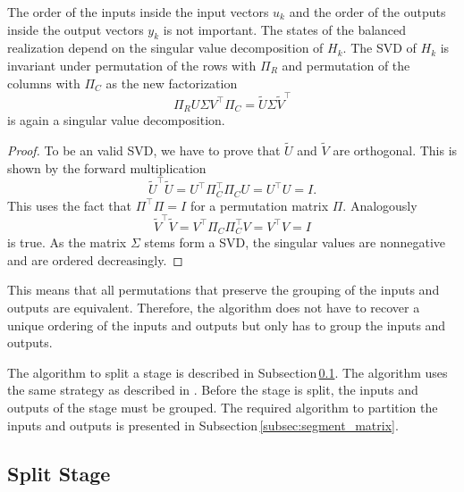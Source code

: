 \documentclass[numbers=noenddot,doctype=mastersthesis,BCOR=15mm,biblatex]{ldvbook}%
\newcommand{\eye}{I} %
\begin{document}
The order of the inputs inside the input vectors $u_k$ and the order of the outputs inside the output vectors $y_k$ is not important.
The states of the balanced realization depend on the singular value decomposition of $H_k$.
The SVD of $H_k$ is invariant under permutation of the rows with $\Pi_R$ and permutation of the columns with $\Pi_C$ as the new factorization
\begin{equation}
\Pi_R U \Sigma V^\top \Pi_C = \tilde{U} \Sigma \tilde{V}^\top 
\end{equation}
is again a singular value decomposition.
\begin{proof}
	To be an valid SVD, we have to prove that $\tilde{U}$ and $\tilde{V}$ are orthogonal.
	This is shown by the forward multiplication
	\begin{equation}
	\tilde{U}^\top \tilde{U} = U^\top \Pi_C^\top \Pi_C U = U^\top U = \eye 
	.
	\end{equation}
	This uses the fact that $\Pi^\top \Pi = \eye$ for a permutation matrix $\Pi$.
	Analogously 
	\begin{equation}
	\tilde{V}^\top \tilde{V} = V^\top \Pi_C \Pi_C^\top V = V^\top V = \eye
	\end{equation}
	is true.
	As the matrix $\Sigma$ stems form a SVD, the singular values are nonnegative and are ordered decreasingly.
\end{proof}
This means that all permutations that preserve the grouping of the inputs and outputs are equivalent.
Therefore, the algorithm does not have to recover a unique ordering of the inputs and outputs but only has to group the inputs and outputs.

The algorithm to split a stage is described in Subsection\,\ref{subsec:split_stage}.
The algorithm uses the same strategy as described in \cite{chandrasekaran_fast_2005}.
Before the stage is split, the inputs and outputs of the stage must be grouped. 
The required algorithm to partition the inputs and outputs is presented in Subsection\,\ref{subsec:segment_matrix}.


\subsection{Split Stage}\label{subsec:split_stage}
\end{document}
